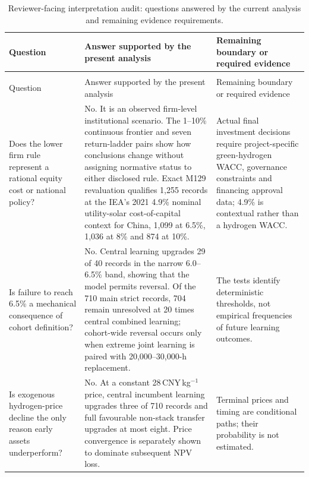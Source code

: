 \documentclass[pdflatex,sn-nature]{sn-jnl}
\renewcommand{\thetable}{S\arabic{table}}
\begin{document}
\begingroup
\footnotesize
\setlength{\LTleft}{0pt}
\setlength{\LTright}{0pt}
\begin{longtable}{>{\raggedright\arraybackslash}p{}>{\raggedright\arraybackslash}p{}>{\raggedright\arraybackslash}p{}}
\caption{Reviewer-facing interpretation audit: questions answered by the current analysis and remaining evidence requirements.}\label{tab:questionaudit}\\
\toprule
Question & Answer supported by the present analysis & Remaining boundary or required evidence \\
\midrule
\endfirsthead
\multicolumn{3}{l}{\emph{Table \thetable\ continued}}\\
\toprule
Question & Answer supported by the present analysis & Remaining boundary or required evidence \\
\midrule
\endhead
\bottomrule
\endfoot
\bottomrule
\endlastfoot
Does the lower firm rule represent a rational equity cost or national policy? & No. It is an observed firm-level institutional scenario. The 1--10\% continuous frontier and seven return-ladder pairs show how conclusions change without assigning normative status to either disclosed rule. Exact M129 revaluation qualifies 1,255 records at the IEA's 2021 4.9\% nominal utility-solar cost-of-capital context for China, 1,099 at 6.5\%, 1,036 at 8\% and 874 at 10\%. & Actual final investment decisions require project-specific green-hydrogen WACC, governance constraints and financing approval data; 4.9\% is contextual rather than a hydrogen WACC. \\
Is failure to reach 6.5\% a mechanical consequence of cohort definition? & No. Central learning upgrades 29 of 40 records in the narrow 6.0--6.5\% band, showing that the model permits reversal. Of the 710 main strict records, 704 remain unresolved at 20 times central combined learning; cohort-wide reversal occurs only when extreme joint learning is paired with 20,000--30,000-h replacement. & The tests identify deterministic thresholds, not empirical frequencies of future learning outcomes. \\
Is exogenous hydrogen-price decline the only reason early assets underperform? & No. At a constant 28\,CNY\,kg$^{-1}$ price, central incumbent learning upgrades three of 710 records and full favourable non-stack transfer upgrades at most eight. Price convergence is separately shown to dominate subsequent NPV loss. & Terminal prices and timing are conditional paths; their probability is not estimated. \\

\end{longtable}
\end{document}
